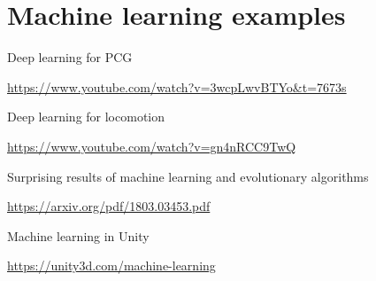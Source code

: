 \part{Machine learning examples}
\frame{\partpage}

\begin{frame}{Deep learning for PCG}
	\begin{center}
		\url{https://www.youtube.com/watch?v=3wcpLwvBTYo&t=7673s}
	\end{center}
\end{frame}

\begin{frame}{Deep learning for locomotion}
    \begin{center}
        \url{https://www.youtube.com/watch?v=gn4nRCC9TwQ}
    \end{center}
\end{frame}

\begin{frame}{Surprising results of machine learning and evolutionary algorithms}
    \begin{center}
        \url{https://arxiv.org/pdf/1803.03453.pdf}
    \end{center}
\end{frame}

\begin{frame}{Machine learning in Unity}
    \begin{center}
        \url{https://unity3d.com/machine-learning}
    \end{center}
\end{frame}
